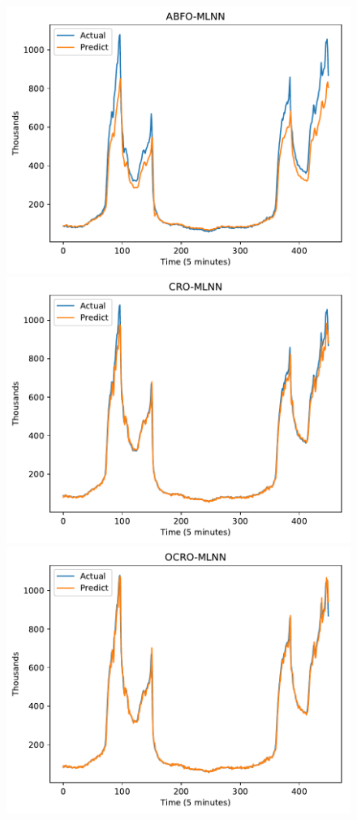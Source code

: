 \documentclass[smallcondensed, natbib]{svjour3}     %
\begin{document}
{\begin{figure}[!ht]
  \begin{minipage}[b]{0.33\linewidth}
    \centering
    \includegraphics[width=0.9\linewidth]{predict/k5/wc_k5_abfo_mlnn.pdf} 
  \end{minipage}
  \begin{minipage}[b]{0.33\linewidth}
    \centering
    \includegraphics[width=0.9\linewidth]{predict/k5/wc_k5_cro_mlnn.pdf} 
  \end{minipage} 
  \begin{minipage}[b]{0.33\linewidth}
    \centering
    \includegraphics[width=0.9\linewidth]{predict/k5/wc_k5_ocro_mlnn.pdf} 

\end{minipage}
\end{figure}}
\end{document}
